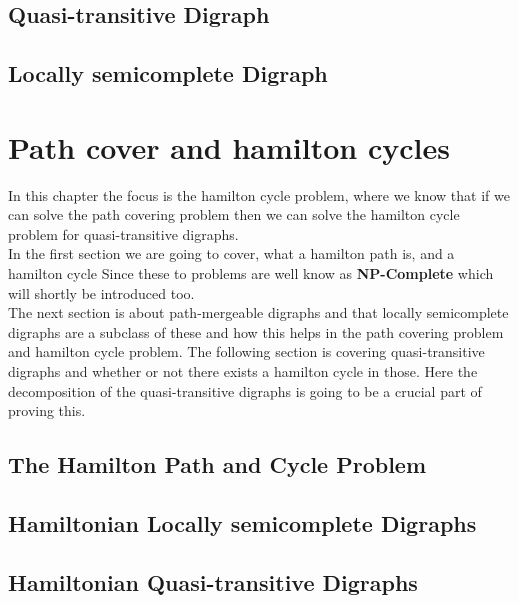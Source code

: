 \section{Quasi-transitive Digraph}
\label{sec:quasi}

\section{Locally semicomplete Digraph}
\label{sec:locally}


\chapter{Path cover and hamilton cycles}
\label{chap:hamilton}
In this chapter the focus is the hamilton cycle problem, where we know that if we can solve the path covering problem then we can solve the hamilton cycle problem for quasi-transitive digraphs.\\
In the first section we are going to cover, what a hamilton path is, and a hamilton cycle Since these to problems are well know as \textbf{NP-Complete} which will shortly be introduced too.\\
The next section is about path-mergeable digraphs and that locally semicomplete digraphs are a subclass of these and how this helps in the path covering problem and hamilton cycle problem. 
The following section is covering quasi-transitive digraphs and whether or not there exists a hamilton cycle in those. Here the decomposition of the quasi-transitive digraphs is going to be a crucial part of proving this. \\


\section{The Hamilton Path and Cycle Problem}
\label{sec:hNP}

\section{Hamiltonian Locally semicomplete Digraphs}
\label{sec:hlocally}

\section{Hamiltonian Quasi-transitive Digraphs}
\label{sec:hquasi}

